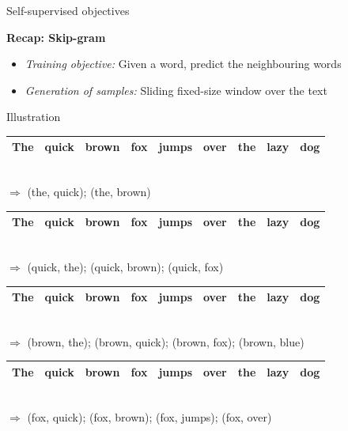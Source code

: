 \begin{frame}{Self-supervised objectives}

\vfill

\textbf{Recap: Skip-gram}
	
	\begin{itemize}
		\item \textit{Training objective:} Given a word, predict the neighbouring words
    \item \textit{Generation of samples:} Sliding fixed-size window over the text
	\end{itemize}
	
\begin{block}{Illustration}
\begin{tabular}{|c|c|c|cccccc|}
\hline
\cellcolor{blue!15}The & \cellcolor{blue!65}quick & \cellcolor{blue!65}brown & fox & jumps & over & the & lazy & dog \\
\hline
\end{tabular}\\
$\Rightarrow$ \quad (the, quick); (the, brown)
\begin{tabular}{|c|c|c|c|ccccc|}
\hline
\cellcolor{blue!65}The & \cellcolor{blue!15}quick & \cellcolor{blue!65}brown & \cellcolor{blue!65}fox & jumps & over & the & lazy & dog \\
\hline
\end{tabular}\\
$\Rightarrow$ \quad (quick, the); (quick, brown); (quick, fox)
\begin{tabular}{|c|c|c|c|ccccc|}
\hline
\cellcolor{blue!65}The & \cellcolor{blue!65}quick & \cellcolor{blue!15}brown & \cellcolor{blue!65}fox & \cellcolor{blue!65}jumps & over & the & lazy & dog \\
\hline
\end{tabular}\\
$\Rightarrow$ \quad (brown, the); (brown, quick); (brown, fox); (brown, blue)
\begin{tabular}{|c|c|c|c|ccccc|}
\hline
The & \cellcolor{blue!65}quick & \cellcolor{blue!65}brown & \cellcolor{blue!15}fox & \cellcolor{blue!65}jumps & \cellcolor{blue!65}over & the & lazy & dog \\
\hline
\end{tabular}\\
$\Rightarrow$ \quad (fox, quick); (fox, brown); (fox, jumps); (fox, over)
\end{block}
	
\vfill

\end{frame}

